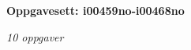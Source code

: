 \centerline{\bf Oppgavesett: i00459no-i00468no}
\vskip 10pt
\centerline{\it 10 oppgaver}\vskip 10pt
\vskip 10pt
